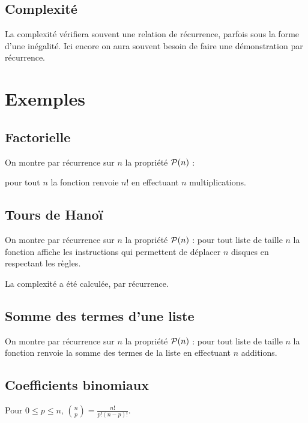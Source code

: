 \subsection{Complexité}
La complexité vérifiera souvent une relation de récurrence, parfois sous la forme d'une inégalité. Ici encore on aura souvent besoin de faire une démonstration par récurrence.
\section{Exemples}
\subsection{Factorielle}
  On montre par récurrence sur $n$ la propriété ${\cal P}(n)$ : 
  
  pour tout $n$ la fonction renvoie $n!$ en effectuant $n$ multiplications.
\subsection{Tours de Hanoï}
   On montre par récurrence sur $n$ la propriété ${\cal P}(n)$ : 
    pour tout liste de taille $n$ la fonction affiche les instructions qui permettent de déplacer $n$ disques en respectant les règles.
  
  La complexité a été calculée, par récurrence.
\subsection{Somme des termes d'une liste}
  On montre par récurrence sur $n$ la propriété ${\cal P}(n)$ : 
    pour tout liste de taille $n$ la fonction renvoie la somme des termes de la liste en effectuant $n$ additions.
\subsection{Coefficients binomiaux}
Pour $0\le p\le n$, $\displaystyle \binom n p=\frac{n!}{p!(n-p)!}$.

